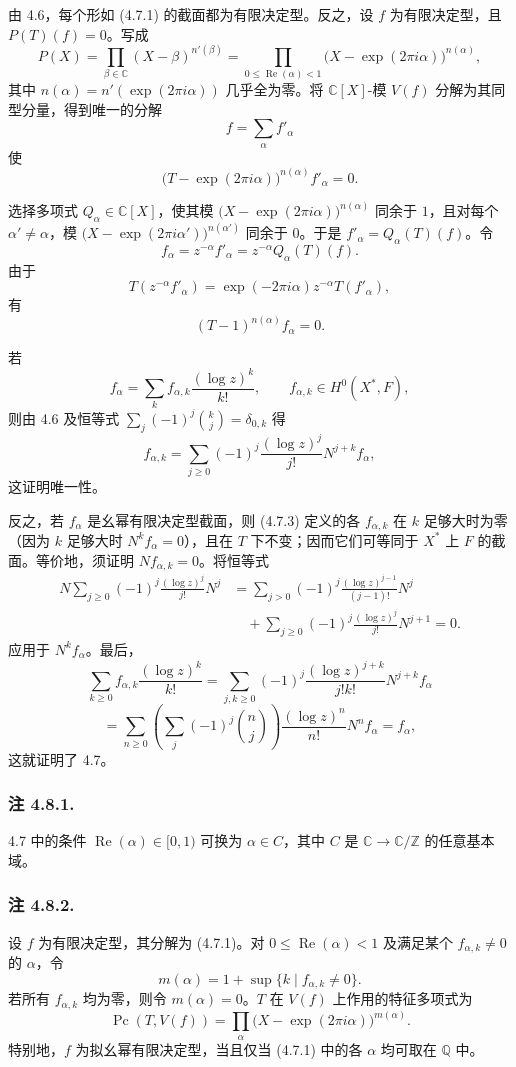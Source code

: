 由 4.6，每个形如 (4.7.1) 的截面都为有限决定型。反之，设 $f$ 为有限决定型，且 $P(T)(f)=0$。写成
\[
P(X)=\prod_{\beta\in\mathbb C}(X-\beta)^{n'(\beta)}
=\prod_{0\leq\operatorname{Re}(\alpha)<1}
 \bigl(X-\exp(2\pi i\alpha)\bigr)^{n(\alpha)},
\]
其中 $n(\alpha)=n'(\exp(2\pi i\alpha))$ 几乎全为零。将 $\mathbb C[X]$-模 $V(f)$ 分解为其同型分量，得到唯一的分解
\[
f=\sum_\alpha f'_\alpha
\]
使
\[
\bigl(T-\exp(2\pi i\alpha)\bigr)^{n(\alpha)}f'_\alpha=0.
\]

选择多项式 $Q_\alpha\in\mathbb C[X]$，使其模 $\bigl(X-\exp(2\pi i\alpha)\bigr)^{n(\alpha)}$ 同余于 $1$，且对每个 $\alpha'\ne\alpha$，模 $\bigl(X-\exp(2\pi i\alpha')\bigr)^{n(\alpha')}$ 同余于 $0$。于是 $f'_\alpha=Q_\alpha(T)(f)$。令
\begin{equation}\tag{4.7.2}
f_\alpha=z^{-\alpha}f'_\alpha
=z^{-\alpha}Q_\alpha(T)(f).
\end{equation}
由于
\[
T(z^{-\alpha}f'_\alpha)
=\exp(-2\pi i\alpha)z^{-\alpha}T(f'_\alpha),
\]
有
\[
(T-1)^{n(\alpha)}f_\alpha=0.
\]

若
\[
f_\alpha=\sum_k f_{\alpha,k}\frac{(\log z)^k}{k!},
\qquad f_{\alpha,k}\in H^0(X^*,F),
\]
则由 4.6 及恒等式 $\sum_j(-1)^j\binom{k}{j}=\delta_{0,k}$ 得
\begin{equation}\tag{4.7.3}
f_{\alpha,k}
=\sum_{j\geq0}(-1)^j\frac{(\log z)^j}{j!}
  N^{j+k}f_\alpha,
\end{equation}
这证明唯一性。

反之，若 $f_\alpha$ 是幺幂有限决定型截面，则 (4.7.3) 定义的各 $f_{\alpha,k}$ 在 $k$ 足够大时为零（因为 $k$ 足够大时 $N^k f_\alpha=0$），且在 $T$ 下不变；因而它们可等同于 $X^*$ 上 $F$ 的截面。等价地，须证明 $Nf_{\alpha,k}=0$。将恒等式
\[
\begin{aligned}
N\sum_{j\geq0}(-1)^j\frac{(\log z)^j}{j!}N^j
&=\sum_{j>0}(-1)^j\frac{(\log z)^{j-1}}{(j-1)!}N^j\\
&\quad+\sum_{j\geq0}(-1)^j\frac{(\log z)^j}{j!}N^{j+1}=0.
\end{aligned}
\]
应用于 $N^k f_\alpha$。最后，
\[
\sum_{k\geq0}f_{\alpha,k}\frac{(\log z)^k}{k!}
=\sum_{j,k\geq0}(-1)^j
 \frac{(\log z)^{j+k}}{j!k!}N^{j+k}f_\alpha
\]
\[
=\sum_{n\geq0}
 \left(\sum_j(-1)^j\binom nj\right)
 \frac{(\log z)^n}{n!}N^n f_\alpha
=f_\alpha,
\]
这就证明了 4.7。

\subsubsection*{注 4.8.1.}
4.7 中的条件 $\operatorname{Re}(\alpha)\in[0,1)$ 可换为 $\alpha\in C$，其中 $C$ 是 $\mathbb C\longrightarrow\mathbb C/\mathbb Z$ 的任意基本域。

\subsubsection*{注 4.8.2.}
设 $f$ 为有限决定型，其分解为 (4.7.1)。对 $0\leq\operatorname{Re}(\alpha)<1$ 及满足某个 $f_{\alpha,k}\ne0$ 的 $\alpha$，令
\[
m(\alpha)=1+\sup\{k\mid f_{\alpha,k}\ne0\}.
\]
若所有 $f_{\alpha,k}$ 均为零，则令 $m(\alpha)=0$。$T$ 在 $V(f)$ 上作用的特征多项式为
\[
\operatorname{Pc}(T,V(f))
=\prod_\alpha\bigl(X-\exp(2\pi i\alpha)\bigr)^{m(\alpha)}.
\]
特别地，$f$ 为拟幺幂有限决定型，当且仅当 (4.7.1) 中的各 $\alpha$ 均可取在 $\mathbb Q$ 中。
